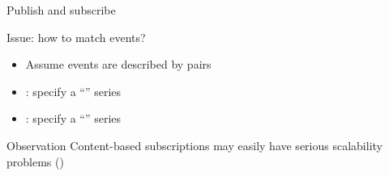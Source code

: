 \begin{slide}{Publish and subscribe}
  \begin{block}{Issue: how to match events?}
    \begin{itemize}\firmlist
    \item Assume events are described by  pairs
    \item {}: specify a ``'' series
    \item {}: specify a ``'' series
    \end{itemize}
  \end{block}
  \centering{}
  \begin{alertblock}{Observation}
    Content-based subscriptions may easily have serious scalability problems ()
  \end{alertblock}
\end{slide}

